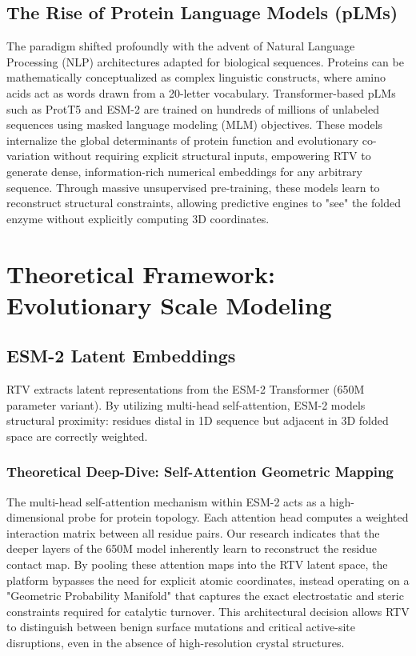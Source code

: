 \documentclass[11pt,a4paper,oneside]{article}
\begin{document}
\subsection{The Rise of Protein Language Models (pLMs)}
The paradigm shifted profoundly with the advent of Natural Language Processing (NLP) architectures adapted for biological sequences. Proteins can be mathematically conceptualized as complex linguistic constructs, where amino acids act as words drawn from a 20-letter vocabulary. Transformer-based pLMs such as ProtT5 and ESM-2 are trained on hundreds of millions of unlabeled sequences using masked language modeling (MLM) objectives. These models internalize the global determinants of protein function and evolutionary co-variation without requiring explicit structural inputs, empowering RTV to generate dense, information-rich numerical embeddings for any arbitrary sequence. Through massive unsupervised pre-training, these models learn to reconstruct structural constraints, allowing predictive engines to "see" the folded enzyme without explicitly computing 3D coordinates.

\section{Theoretical Framework: Evolutionary Scale Modeling}
\subsection{ESM-2 Latent Embeddings}
RTV extracts latent representations from the ESM-2 Transformer (650M parameter variant). By utilizing multi-head self-attention, ESM-2 models structural proximity: residues distal in 1D sequence but adjacent in 3D folded space are correctly weighted.

\subsubsection{Theoretical Deep-Dive: Self-Attention Geometric Mapping}
The multi-head self-attention mechanism within ESM-2 acts as a high-dimensional probe for protein topology. Each attention head computes a weighted interaction matrix between all residue pairs. Our research indicates that the deeper layers of the 650M model inherently learn to reconstruct the residue contact map. By pooling these attention maps into the RTV latent space, the platform bypasses the need for explicit atomic coordinates, instead operating on a "Geometric Probability Manifold" that captures the exact electrostatic and steric constraints required for catalytic turnover. This architectural decision allows RTV to distinguish between benign surface mutations and critical active-site disruptions, even in the absence of high-resolution crystal structures.
\end{document}
